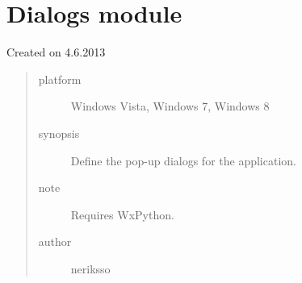 \documentclass[letterpaper,10pt,english]{sphinxmanual}
\begin{document}
\section{Dialogs module}
\label{dialogs:dialogs-module}\label{dialogs::doc}\label{dialogs:module-dialogs}
Created on 4.6.2013
\begin{quote}\begin{description}
\item[{platform}] \leavevmode
Windows Vista, Windows 7, Windows 8

\item[{synopsis}] \leavevmode
Define the pop-up dialogs for the application.

\item[{note}] \leavevmode
Requires WxPython.

\item[{author}] \leavevmode
neriksso

\end{description}\end{quote}
\end{document}
